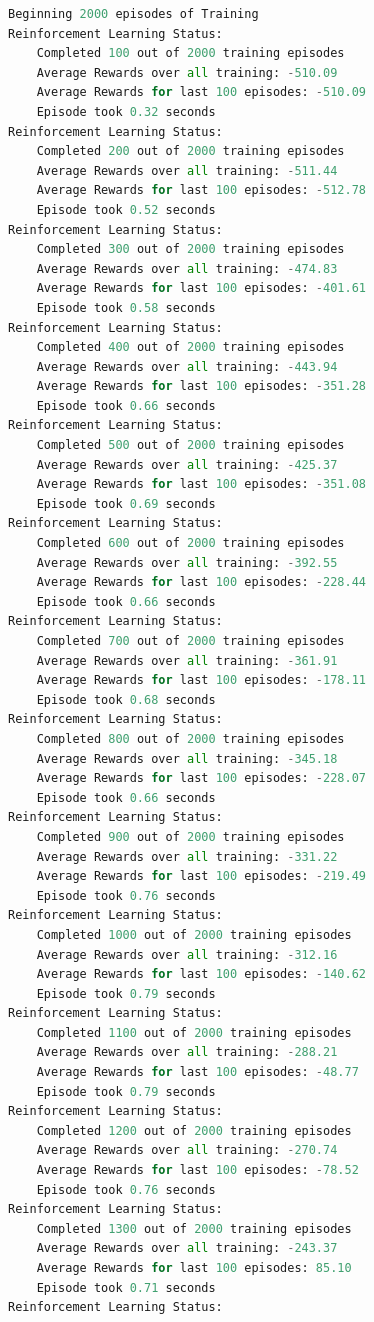 \documentclass{report}
\begin{document}
\begin{lstlisting}[language=Python, caption=Autograder]
Beginning 2000 episodes of Training
Reinforcement Learning Status:
	Completed 100 out of 2000 training episodes
	Average Rewards over all training: -510.09
	Average Rewards for last 100 episodes: -510.09
	Episode took 0.32 seconds
Reinforcement Learning Status:
	Completed 200 out of 2000 training episodes
	Average Rewards over all training: -511.44
	Average Rewards for last 100 episodes: -512.78
	Episode took 0.52 seconds
Reinforcement Learning Status:
	Completed 300 out of 2000 training episodes
	Average Rewards over all training: -474.83
	Average Rewards for last 100 episodes: -401.61
	Episode took 0.58 seconds
Reinforcement Learning Status:
	Completed 400 out of 2000 training episodes
	Average Rewards over all training: -443.94
	Average Rewards for last 100 episodes: -351.28
	Episode took 0.66 seconds
Reinforcement Learning Status:
	Completed 500 out of 2000 training episodes
	Average Rewards over all training: -425.37
	Average Rewards for last 100 episodes: -351.08
	Episode took 0.69 seconds
Reinforcement Learning Status:
	Completed 600 out of 2000 training episodes
	Average Rewards over all training: -392.55
	Average Rewards for last 100 episodes: -228.44
	Episode took 0.66 seconds
Reinforcement Learning Status:
	Completed 700 out of 2000 training episodes
	Average Rewards over all training: -361.91
	Average Rewards for last 100 episodes: -178.11
	Episode took 0.68 seconds
Reinforcement Learning Status:
	Completed 800 out of 2000 training episodes
	Average Rewards over all training: -345.18
	Average Rewards for last 100 episodes: -228.07
	Episode took 0.66 seconds
Reinforcement Learning Status:
	Completed 900 out of 2000 training episodes
	Average Rewards over all training: -331.22
	Average Rewards for last 100 episodes: -219.49
	Episode took 0.76 seconds
Reinforcement Learning Status:
	Completed 1000 out of 2000 training episodes
	Average Rewards over all training: -312.16
	Average Rewards for last 100 episodes: -140.62
	Episode took 0.79 seconds
Reinforcement Learning Status:
	Completed 1100 out of 2000 training episodes
	Average Rewards over all training: -288.21
	Average Rewards for last 100 episodes: -48.77
	Episode took 0.79 seconds
Reinforcement Learning Status:
	Completed 1200 out of 2000 training episodes
	Average Rewards over all training: -270.74
	Average Rewards for last 100 episodes: -78.52
	Episode took 0.76 seconds
Reinforcement Learning Status:
	Completed 1300 out of 2000 training episodes
	Average Rewards over all training: -243.37
	Average Rewards for last 100 episodes: 85.10
	Episode took 0.71 seconds
Reinforcement Learning Status:

\end{lstlisting}
\end{document}
